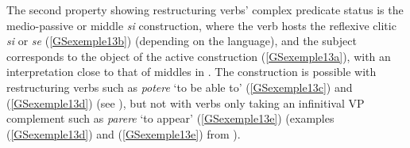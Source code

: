  \label{GSexemple12b} 

 \label{GSexemple12c} 
		
\label{GSexemple12d} 
		
\label{GSexemple12e} 
	
\label{GSexemple12f}
		
\label{GSexemple12g} 
	
\label{GSexemple12h} 
\zl

\noindent
The second property showing restructuring verbs' complex predicate status is the medio-passive or middle \emph{si} construction, where the verb hosts the reflexive clitic \emph{si} or \emph{se} (\ref{GSexemple13b}) (depending on the language), and the subject corresponds to the object of the active construction (\ref{GSexemple13a}), with an interpretation close to that of middles in . The construction is possible with restructuring verbs such as \emph{potere} `to be able to' (\ref{GSexemple13c}) and (\ref{GSexemple13d}) (see \citealt[333--336]{Monachesi98a}), but not with verbs only taking an infinitival VP complement such as \emph{parere} `to appear' (\ref{GSexemple13e}) (examples (\ref{GSexemple13d}) and (\ref{GSexemple13e}) from \citealt[122]{AG2010}).


